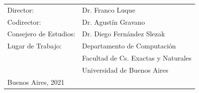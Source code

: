 {\large

\begin{tabular}{l l}
    \vspace{.3cm} Director:    & Dr. Franco Luque \\
    \vspace{.3cm} Codirector:  & Dr. Agustín Gravano \\
    \vspace{.3cm} Consejero de Estudios:  & Dr. Diego Fernández Slezak \\
    Lugar de Trabajo:          & Departamento de Computación \\
                               & Facultad de Cs. Exactas y Naturales \\
    \vspace{1cm}               & Universidad de Buenos Aires \\
    Buenos Aires, 2021         & \\
\end{tabular}

\vspace{.2cm}



\vspace{.2cm}


}

\newpage\thispagestyle{empty}
